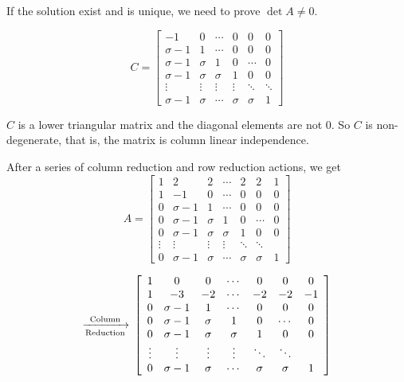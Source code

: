 If the solution exist and is unique, we need to prove $\det A \neq 0$. 

\begin{equation}
{
C = \left[ \begin{array}{cccccc}
-1 & 0 & \cdots& 0 & 0 & 0\\
\sigma-1 & 1 & \cdots & 0 & 0 & 0 \\
\sigma-1 & \sigma & 1 & 0 & \cdots & 0 \\
\sigma-1 & \sigma & \sigma & 1 & 0 & 0 \\
\vdots & \vdots & \vdots  &   \vdots & \ddots & \ddots\\
\sigma-1 & \sigma & \cdots & \sigma & \sigma & 1
\end{array} 
\right ]
}
\end{equation}

$C$ is a lower triangular matrix and the diagonal elements are not $0$.  So $C$ is non-degenerate, that is, the matrix is column linear independence.

After a series of column reduction and row reduction actions, we get
\begin{equation*}
     {A = \left[ \begin{array}{ccccccc}
1 & 2 & 2 & \cdots & 2 & 2 & 1\\
1 & -1 & 0 & \cdots& 0 & 0 & 0\\
0 & \sigma-1 & 1 & \cdots & 0 & 0 & 0 \\
0 & \sigma-1 & \sigma & 1 & 0 & \cdots & 0 \\
0 & \sigma-1 & \sigma & \sigma & 1 & 0 & 0 \\
\vdots & \vdots & \vdots  &   \vdots & \ddots & \ddots\\
0 & \sigma-1 & \sigma & \cdots & \sigma & \sigma & 1
\end{array} 
\right ]}
\end{equation*}


\begin{equation*}
{
\xrightarrow[\text{Reduction}]{\text{Column}}\\
\left[ \begin{array}{ccccccc}
1 & 0 & 0 & \cdots & 0 & 0 & 0\\
1 & -3 & -2 & \cdots& -2 & -2 & -1\\
0 & \sigma-1 & 1 & \cdots & 0 & 0 & 0 \\
0 & \sigma-1 & \sigma & 1 & 0 & \cdots & 0 \\
0 & \sigma-1 & \sigma & \sigma & 1 & 0 & 0 \\
\vdots & \vdots & \vdots  &   \vdots & \ddots & \ddots\\
0 & \sigma-1 & \sigma & \cdots & \sigma & \sigma & 1
\end{array} 
\right ]}
\end{equation*}

